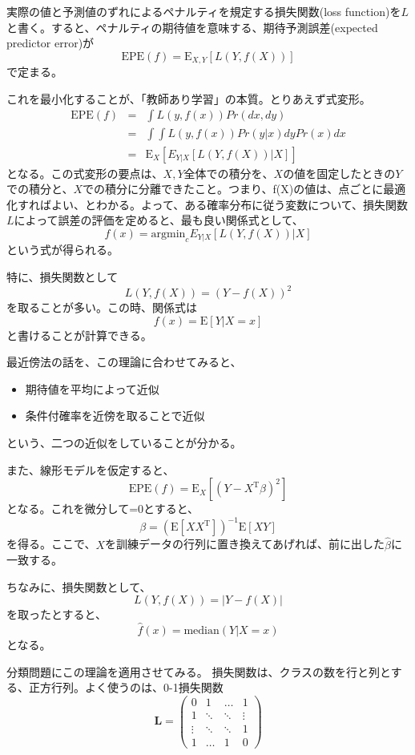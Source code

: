 \documentclass[uplatex]{jsarticle}
\begin{document}
実際の値と予測値のずれによるペナルティを規定する損失関数(loss function)を$L$と書く。すると、ペナルティの期待値を意味する、期待予測誤差(expected predictor error)が
\[
  \mathrm{EPE}(f)=\mathrm{E}_{X,Y}[L(Y,f(X))]
\]
で定まる。

これを最小化することが、「教師あり学習」の本質。とりあえず式変形。
\begin{eqnarray*}
  \mathrm{EPE}(f)&=&\int L(y, f(x)) Pr(dx, dy) \\
  &=&\int \int L(y,f(x)) Pr(y|x) dy Pr(x) dx \\
  &=& \mathrm{E} _X[E_{Y|X}[L(Y, f(X))|X]]
\end{eqnarray*}
となる。この式変形の要点は、$X,Y$全体での積分を、$X$の値を固定したときの$Y$での積分と、$X$での積分に分離できたこと。つまり、f(X)の値は、点ごとに最適化すればよい、とわかる。よって、ある確率分布に従う変数について、損失関数$L$によって誤差の評価を定めると、最も良い関係式として、
\[
  f(x)=\mathrm{argmin} _c E_{Y|X}[L(Y, f(X))|X]
\]
という式が得られる。

特に、損失関数として
\[
  L(Y, f(X)) = (Y-f(X))^2
\]
を取ることが多い。この時、関係式は
\[
  f(x) = \mathrm{E}[Y|X=x]
\]
と書けることが計算できる。

最近傍法の話を、この理論に合わせてみると、
\begin{itemize}
  \item 期待値を平均によって近似
  \item 条件付確率を近傍を取ることで近似
\end{itemize}
という、二つの近似をしていることが分かる。

また、線形モデルを仮定すると、
\[
  \mathrm{EPE}(f)=\mathrm{E}_X[(Y-X^\mathrm{T}\beta)^2]
\]
となる。これを微分して=0とすると、
\[
  \beta=(\mathrm{E}[XX^\mathrm{T}])^{-1}\mathrm{E}[XY]
\]
を得る。ここで、$X$を訓練データの行列に置き換えてあげれば、前に出した$\hat{\beta}$に一致する。

ちなみに、損失関数として、
\[
  L(Y, f(X)) = |Y-f(X)|
\]
を取ったとすると、
\[
  \hat{f}(x) = \mathrm{median}(Y|X=x)
\]
となる。

分類問題にこの理論を適用させてみる。
損失関数は、クラスの数を行と列とする、正方行列。よく使うのは、0-1損失関数
\[
\textbf{L} = \left(
    \begin{array}{cccc}
      0 & 1 & \dots & 1 \\
      1 & \ddots & \ddots & \vdots \\
      \vdots & \ddots & \ddots & 1 \\
      1 & \dots & 1 & 0
    \end{array}
  \right)
\]
\end{document}
